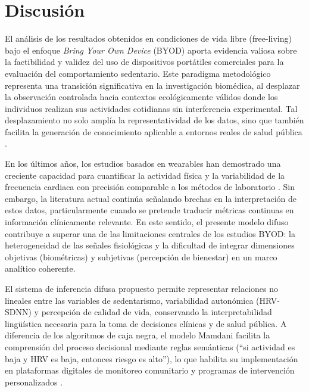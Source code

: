 
\chapter{Discusión}
\label{cap:discusion}

El análisis de los resultados obtenidos en condiciones de vida libre (free-living) bajo el enfoque \textit{Bring Your Own Device} (BYOD) aporta evidencia valiosa sobre la factibilidad y validez del uso de dispositivos portátiles comerciales para la evaluación del comportamiento sedentario. Este paradigma metodológico representa una transición significativa en la investigación biomédica, al desplazar la observación controlada hacia contextos ecológicamente válidos donde los individuos realizan sus actividades cotidianas sin interferencia experimental. Tal desplazamiento no solo amplía la representatividad de los datos, sino que también facilita la generación de conocimiento aplicable a entornos reales de salud pública \cite{Doherty2021,Liu2022}.

En los últimos años, los estudios basados en wearables han demostrado una creciente capacidad para cuantificar la actividad física y la variabilidad de la frecuencia cardiaca con precisión comparable a los métodos de laboratorio \cite{Strain2020,Henriksen2018}. Sin embargo, la literatura actual continúa señalando brechas en la interpretación de estos datos, particularmente cuando se pretende traducir métricas continuas en información clínicamente relevante. En este sentido, el presente modelo difuso contribuye a superar una de las limitaciones centrales de los estudios BYOD: la heterogeneidad de las señales fisiológicas y la dificultad de integrar dimensiones objetivas (biométricas) y subjetivas (percepción de bienestar) en un marco analítico coherente.

El sistema de inferencia difusa propuesto permite representar relaciones no lineales entre las variables de sedentarismo, variabilidad autonómica (HRV-SDNN) y percepción de calidad de vida, conservando la interpretabilidad lingüística necesaria para la toma de decisiones clínicas y de salud pública. A diferencia de los algoritmos de caja negra, el modelo Mamdani facilita la comprensión del proceso decisional mediante reglas semánticas (``si actividad es baja y HRV es baja, entonces riesgo es alto''), lo que habilita su implementación en plataformas digitales de monitoreo comunitario y programas de intervención personalizados \cite{Kaur2022,Escalante2023}.

